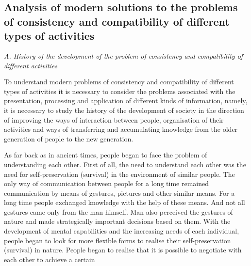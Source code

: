 \documentclass[10pt, a4paper]{article}
\begin{document}
\begin{multicols}{2}
\section{Analysis of modern solutions to the problems of
consistency and compatibility of different types of
activities}

\textit{A. History of the development of the problem of consistency and compatibility of different activities}

To understand modern problems of consistency and
compatibility of different types of activities it is necessary to consider the problems associated with the presentation, processing and application of different kinds
of information, namely, it is necessary to study the
history of the development of society in the direction
of improving the ways of interaction between people,
organisation of their activities and ways of transferring
and accumulating knowledge from the older generation
of people to the new generation.

As far back as in ancient times, people began to face
the problem of understanding each other. First of all,
the need to understand each other was the need for
self-preservation (survival) in the environment of similar
people. The only way of communication between people
for a long time remained communication by means of
gestures, pictures and other similar means. For a long
time people exchanged knowledge with the help of these
means. And not all gestures came only from the man
himself. Man also perceived the gestures of nature and
made strategically important decisions based on them.
With the development of mental capabilities and the
increasing needs of each individual, people began to look
for more flexible forms to realise their self-preservation
(survival) in nature. People began to realise that it is
possible to negotiate with each other to achieve a certain
\end{multicols}
\end{document}
